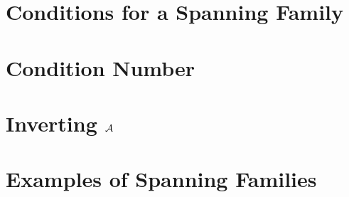 
\section{Conditions for a Spanning Family}

\label{sec:span_fam}
\section{Condition Number}

\label{sec:con_number}
\section{Inverting $\mathcal{A}$}

\label{sec:meas_expl_inv}
\section{Examples of Spanning Families}

\label{sec:meas_examp}
